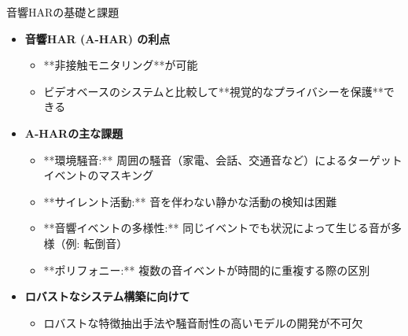 \documentclass[unicode,12pt,aspectratio=169,dvipdfmx]{beamer}
\begin{document}
\begin{frame}{音響HARの基礎と課題}
\begin{itemize}
    \item \textbf{音響HAR (A-HAR) の利点}
    \begin{itemize}
        \item **非接触モニタリング**が可能
        \item ビデオベースのシステムと比較して**視覚的なプライバシーを保護**できる
    \end{itemize}
    \item \textbf{A-HARの主な課題}
    \begin{itemize}
        \item **環境騒音:** 周囲の騒音（家電、会話、交通音など）によるターゲットイベントのマスキング
        \item **サイレント活動:** 音を伴わない静かな活動の検知は困難
        \item **音響イベントの多様性:** 同じイベントでも状況によって生じる音が多様（例: 転倒音）
        \item **ポリフォニー:** 複数の音イベントが時間的に重複する際の区別
    \end{itemize}
    \item \textbf{ロバストなシステム構築に向けて}
    \begin{itemize}
        \item ロバストな特徴抽出手法や騒音耐性の高いモデルの開発が不可欠
    \end{itemize}
\end{itemize}
\end{frame}
\end{document}
